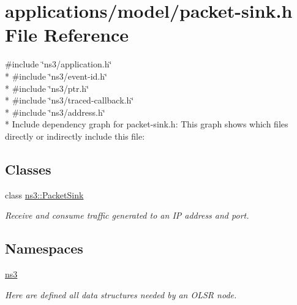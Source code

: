 \hypertarget{packet-sink_8h}{}\section{applications/model/packet-\/sink.h File Reference}
\label{packet-sink_8h}
{\ttfamily \#include \char`\"{}ns3/application.\+h\char`\"{}}\\*
{\ttfamily \#include \char`\"{}ns3/event-\/id.\+h\char`\"{}}\\*
{\ttfamily \#include \char`\"{}ns3/ptr.\+h\char`\"{}}\\*
{\ttfamily \#include \char`\"{}ns3/traced-\/callback.\+h\char`\"{}}\\*
{\ttfamily \#include \char`\"{}ns3/address.\+h\char`\"{}}\\*
Include dependency graph for packet-\/sink.h\+:
This graph shows which files directly or indirectly include this file\+:
\subsection*{Classes}
\begin{DoxyCompactItemize}
\item 
class \hyperlink{classns3_1_1PacketSink}{ns3\+::\+Packet\+Sink}
\begin{DoxyCompactList}\small\item\em Receive and consume traffic generated to an IP address and port. \end{DoxyCompactList}\end{DoxyCompactItemize}
\subsection*{Namespaces}
\begin{DoxyCompactItemize}
\item 
 \hyperlink{namespacens3}{ns3}
\begin{DoxyCompactList}\small\item\em Here are defined all data structures needed by an O\+L\+SR node. \end{DoxyCompactList}\end{DoxyCompactItemize}
